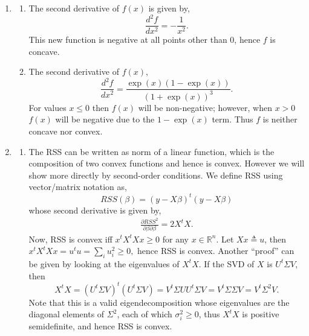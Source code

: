 \documentclass[10pt]{article}
\begin{document}
\begin{enumerate}
\item
\begin{enumerate}
\item
The second derivative of $f(x)$ is given by, \[\frac{d^2 f}{d x^2} = -\frac{1}{x^2}.\] This new function
is negative at all points other than 0, hence $f$ is concave.
\item
The second derivative of $f(x)$, \[\frac{d^2 f}{d x^2} = \frac{\exp(x)(1 - \exp(x))}{(1 +
\exp(x))^3}.\] For values $x \leq 0$ then $f(x)$ will be non-negative; however, when $x > 0$
$f(x)$ will be negative due to the $1 - \exp(x)$ term. Thus $f$ is neither concave nor convex.
\end{enumerate}

\item
\begin{enumerate}
\item
The RSS can be written as norm of a linear function, which is the composition of two convex
functions and hence is convex. However we will show more directly by second-order conditions.
We define RSS using vector/matrix notation as, \[RSS(\beta) = (y - X\beta)^t(y - X\beta)\] whose
second derivative is given by,
\begin{align*}
    \frac{\partial RSS^2}{\partial \beta \partial \beta} = 2X^t X.
\end{align*}
Now, RSS is convex iff $x^tX^tXx \geq 0$ for any $x \in \mathbb{R}^n$. Let $Xx \triangleq u$, then
$x^tX^tXx = u^t u = \sum_i u_i^2 \geq 0,$ hence RSS is convex. Another ``proof'' can be given by 
looking at the eigenvalues of $X^tX$. If the SVD of $X$ is $U^t\Sigma V$, then 
\[
    X^tX = (U^t\Sigma V)^t (U^t\Sigma V) = V^t\Sigma U U^t\Sigma V = V^t \Sigma \Sigma V = V^t \Sigma^2 V.
\] Note that this is a valid eigendecomposition whose eigenvalues are the diagonal elements of
$\Sigma^2$, each of which $\sigma^2_i \geq 0$, thus $X^tX$ is positive semidefinite, and hence RSS is convex.


\end{enumerate}
\end{enumerate}
\end{document}
